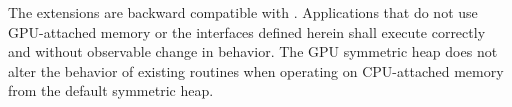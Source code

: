 
The extensions are backward compatible with . Applications that do
not use GPU-attached memory or the interfaces defined herein shall execute
correctly and without observable change in behavior. The \ac{GPU} symmetric heap
does not alter the behavior of existing routines when operating on CPU-attached
memory from the default symmetric heap.

